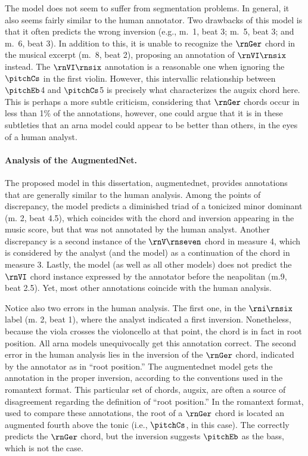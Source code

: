 The \textcite{mcleod2021modular} model does not seem to
suffer from segmentation problems. In general, it also seems
fairly similar to the human annotator. Two drawbacks of this
model is that it often predicts the wrong inversion (e.g.,
m.~1, beat 3; m.~5, beat 3; and m.~6, beat 3). In addition
to this, it is unable to recognize the $\rnGer$ chord in the
musical excerpt (m.~8, beat 2), proposing an annotation of
$\rnVI\rnsix$ instead. The $\rnVI\rnsix$ annotation is a
reasonable one when ignoring the $\pitchCs$ in the first
violin. However, this intervallic relationship between
$\pitchEb$4 and $\pitchCs$5 is precisely what characterizes
the \gls{augsix} chord here. This is perhaps a more subtle
criticism, considering that $\rnGer$ chords occur in less
than 1\% of the annotations, however, one could argue that
it is in these subtleties that an \gls{arna} model could
appear to be better than others, in the eyes of a human
analyst.

\paragraph{Analysis of the AugmentedNet.}

The proposed model in this dissertation, \gls{augmentednet},
provides annotations that are generally similar to the human
analysis. Among the points of discrepancy, the model
predicts a diminished triad of a tonicized minor dominant
(m. 2, beat 4.5), which coincides with the chord and
inversion appearing in the music score, but that was not
annotated by the human analyst. Another discrepancy is a
second instance of the $\rnV\rnseven$ chord in measure 4,
which is considered by the analyst (and the
\textcite{mcleod2021modular} model) as a continuation of the
chord in measure 3. Lastly, the model (as well as all other
models) does not predict the $\rnVI$ chord instance
expressed by the annotator before the \gls{neapolitan} (m.9,
beat 2.5). Yet, most other annotations coincide with the
human analysis.

Notice also two errors in the human analysis. The first one,
in the $\rni\rnsix$ label (m. 2, beat 1), where the analyst
indicated a first inversion. Nonetheless, because the viola
crosses the violoncello at that point, the chord is in fact
in root position. All \gls{arna} models unequivocally get
this annotation correct. The second error in the human
analysis lies in the inversion of the $\rnGer$ chord,
indicated by the annotator as in ``root position.'' The
\gls{augmentednet} model gets the annotation in the proper
inversion, according to the conventions used in the
\gls{romantext} format. This particular set of chords,
\gls{augsix}, are often a source of disagreement regarding
the definition of ``root position.'' In the \gls{romantext}
format, used to compare these annotations, the root of a
$\rnGer$ chord is located an augmented fourth above the
tonic (i.e., $\pitchCs$, in this case). The
\textcite{micchi2021deep} correctly predicts the $\rnGer$
chord, but the inversion suggests $\pitchEb$ as the bass,
which is not the case. 

